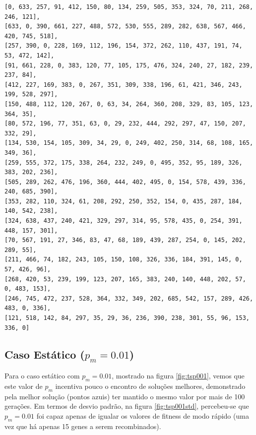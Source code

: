 \begin{lstlisting}[float, floatplacement=H, caption={Mapa de cidades para o problema do Caixeiro Viajante Adaptado.}, label=lst:cidades]
[0, 633, 257, 91, 412, 150, 80, 134, 259, 505, 353, 324, 70, 211, 268, 246, 121],
[633, 0, 390, 661, 227, 488, 572, 530, 555, 289, 282, 638, 567, 466, 420, 745, 518],
[257, 390, 0, 228, 169, 112, 196, 154, 372, 262, 110, 437, 191, 74, 53, 472, 142],
[91, 661, 228, 0, 383, 120, 77, 105, 175, 476, 324, 240, 27, 182, 239, 237, 84],
[412, 227, 169, 383, 0, 267, 351, 309, 338, 196, 61, 421, 346, 243, 199, 528, 297],
[150, 488, 112, 120, 267, 0, 63, 34, 264, 360, 208, 329, 83, 105, 123, 364, 35],
[80, 572, 196, 77, 351, 63, 0, 29, 232, 444, 292, 297, 47, 150, 207, 332, 29],
[134, 530, 154, 105, 309, 34, 29, 0, 249, 402, 250, 314, 68, 108, 165, 349, 36],
[259, 555, 372, 175, 338, 264, 232, 249, 0, 495, 352, 95, 189, 326, 383, 202, 236],
[505, 289, 262, 476, 196, 360, 444, 402, 495, 0, 154, 578, 439, 336, 240, 685, 390],
[353, 282, 110, 324, 61, 208, 292, 250, 352, 154, 0, 435, 287, 184, 140, 542, 238],
[324, 638, 437, 240, 421, 329, 297, 314, 95, 578, 435, 0, 254, 391, 448, 157, 301],
[70, 567, 191, 27, 346, 83, 47, 68, 189, 439, 287, 254, 0, 145, 202, 289, 55],
[211, 466, 74, 182, 243, 105, 150, 108, 326, 336, 184, 391, 145, 0, 57, 426, 96],
[268, 420, 53, 239, 199, 123, 207, 165, 383, 240, 140, 448, 202, 57, 0, 483, 153],
[246, 745, 472, 237, 528, 364, 332, 349, 202, 685, 542, 157, 289, 426, 483, 0, 336],
[121, 518, 142, 84, 297, 35, 29, 36, 236, 390, 238, 301, 55, 96, 153, 336, 0]
\end{lstlisting}

\subsection{Caso Estático ($p_m = 0.01$)}

Para o caso estático com $p_m = 0.01$, mostrado na figura \ref{fig:tsp001}, vemos que este valor de $p_m$ incentiva pouco o encontro de soluções melhores, demonstrado pela melhor solução (pontos azuis) ter mantido o mesmo valor por mais de 100 gerações. Em termos de desvio padrão, na figura \ref{fig:tsp001std}, percebeu-se que $p_m = 0.01$ foi capaz apenas de igualar os valores de fitness de modo rápido (uma vez que há apenas 15 genes a serem recombinados).

